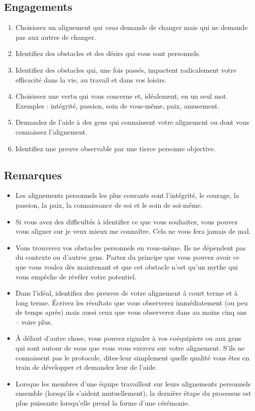 \documentclass[paper=6in:9in,pagesize=pdftex,headinclude=on,footinclude=on,12pt]{scrbook}
\begin{document}
\subsection{Engagements}
\begin{enumerate}
	\item Choisissez un alignement qui \emph{vous} demande de changer mais qui ne demande pas aux autres de changer.
	\item Identifiez des obstacles et des désirs qui vous sont personnels.
	\item Identifiez des obstacles qui, une fois passés, impactent radicalement votre efficacité dans la vie, au travail et dans vos loisirs.
	\item Choisissez une vertu qui vous concerne et, idéalement, en un seul mot. Exemples : intégrité, passion, soin de vous-même, paix, amusement.
	\item Demandez de l'aide à des gens qui connaissent votre alignement ou dont vous connaissez l'alignement.
	\item Identifiez une preuve observable par une tierce personne objective.
\end{enumerate}

\subsection{Remarques}
\begin{itemize}
	\item Les alignements personnels les plus courants sont l'intégrité, le courage, la passion, la paix, la connaissance de soi et le soin de soi-même.
	\item Si vous avez des difficultés à identifier ce que vous souhaitez, vous pouvez vous aligner sur \og{}je veux mieux me connaître\fg{}. Cela ne vous
	      fera jamais de mal.
	\item Vous trouverez vos obstacles personnels en vous-même. Ils ne dépendent pas du contexte ou d'autres gens. Partez du principe que vous pouvez avoir ce
	      que vous voulez dès maintenant et que cet obstacle n'est qu'un mythe qui vous empêche de révéler votre potentiel.
	\item Dans l'idéal, identifiez des preuves de votre alignement à court terme et à long terme. Écrivez les résultats que vous observerez immédiatement (ou
	      peu de temps après) mais aussi ceux que vous observerez dans au moins cinq ans -- voire plus.
	\item À défaut d'autre chose, vous pouvez signaler à vos coéquipiers ou aux gens qui sont autour de vous que vous vous exercez sur votre alignement.
	      S'ils ne connaissent pas le protocole, dites-leur simplement quelle qualité vous êtes en train de développer et demandez leur de l'aide.
	\item Lorsque les membres d'une équipe travaillent sur leurs alignements personnels ensemble (lorsqu'ils s'aident mutuellement), la dernière étape du
	      processus est plus puissante lorsqu'elle prend la forme d'une cérémonie.
\end{itemize}
\end{document}

